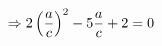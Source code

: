 \documentclass[preview]{standalone}
\begin{document}
\begin{align*}
\special{dvisvgm:raw <g id='unique000'>}\Rightarrow 2\left(\frac{a}{c}\right)^2-5\frac{a}{c}+2=0\special{dvisvgm:raw </g>}
\end{align*}
\end{document}
